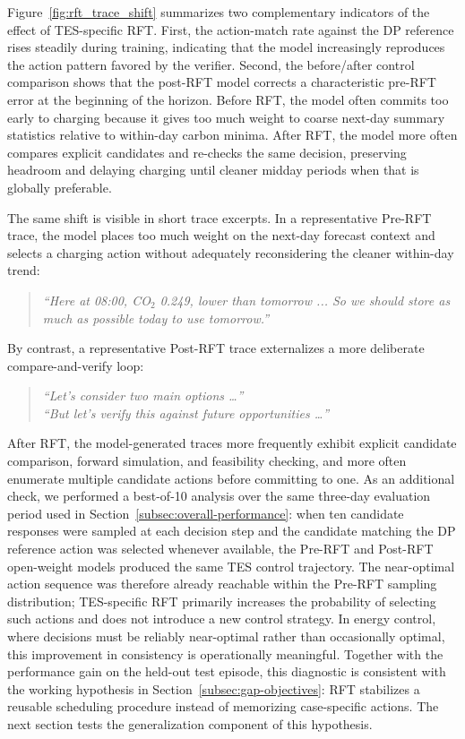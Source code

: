 \documentclass[11pt]{article}
\begin{document}
Figure~\ref{fig:rft_trace_shift} summarizes two complementary indicators of the effect of TES-specific RFT. First, the action-match rate against the DP reference rises steadily during training, indicating that the model increasingly reproduces the action pattern favored by the verifier. Second, the before/after control comparison shows that the post-RFT model corrects a characteristic pre-RFT error at the beginning of the horizon. Before RFT, the model often commits too early to charging because it gives too much weight to coarse next-day summary statistics relative to within-day carbon minima. After RFT, the model more often compares explicit candidates and re-checks the same decision, preserving headroom and delaying charging until cleaner midday periods when that is globally preferable.

The same shift is visible in short trace excerpts. In a representative Pre-RFT trace, the model places too much weight on the next-day forecast context and selects a charging action without adequately reconsidering the cleaner within-day trend:
\begin{quote}
\small\itshape
``Here at 08:00, CO$_2$ 0.249, lower than tomorrow ... So we should store as much as possible today to use tomorrow.''
\end{quote}
By contrast, a representative Post-RFT trace externalizes a more deliberate compare-and-verify loop:
\begin{quote}
\small\itshape
``Let's consider two main options \ldots''\\
``But let's verify this against future opportunities \ldots''
\end{quote}
After RFT, the model-generated traces more frequently exhibit explicit candidate comparison, forward simulation, and feasibility checking, and more often enumerate multiple candidate actions before committing to one. As an additional check, we performed a best-of-10 analysis over the same three-day evaluation period used in Section~\ref{subsec:overall-performance}: when ten candidate responses were sampled at each decision step and the candidate matching the DP reference action was selected whenever available, the Pre-RFT and Post-RFT open-weight models produced the same TES control trajectory. The near-optimal action sequence was therefore already reachable within the Pre-RFT sampling distribution; TES-specific RFT primarily increases the probability of selecting such actions and does not introduce a new control strategy. In energy control, where decisions must be reliably near-optimal rather than occasionally optimal, this improvement in consistency is operationally meaningful. Together with the performance gain on the held-out test episode, this diagnostic is consistent with the working hypothesis in Section~\ref{subsec:gap-objectives}: RFT stabilizes a reusable scheduling procedure instead of memorizing case-specific actions. The next section tests the generalization component of this hypothesis.
\end{document}
